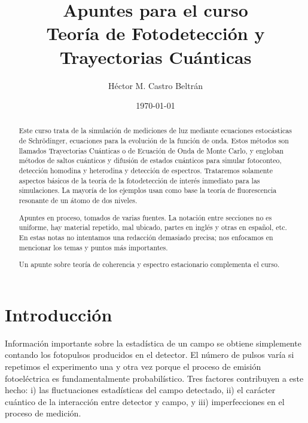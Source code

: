 \documentclass[twocolumn,aps,eqsecnum,showkeys,amsmath]{revtex4}
\begin{document}
\title{Apuntes para el curso  \\
Teor\'ia de Fotodetecci\'on y Trayectorias Cu\'anticas}
\author{H\'ector M. Castro Beltr\'an}

\date{\today}
\begin{abstract} 
Este curso trata de la simulaci\'on de mediciones de luz mediante 
ecuaciones estoc\'asticas de Schr\"odinger, ecuaciones para la evoluci\'on 
de la funci\'on de onda. Estos m\'etodos son llamados Trayectorias 
Cu\'anticas o de Ecuaci\'on de Onda de Monte Carlo, y engloban m\'etodos 
de saltos cu\'anticos y difusi\'on de estados cu\'anticos para simular 
fotoconteo, detecci\'on homodina y heterodina y  detecci\'on de espectros. 
Trataremos solamente aspectos b\'asicos de la teor\'ia de la fotodetecci\'on 
de inter\'es inmediato para las simulaciones. La mayor\'ia de los ejemplos 
usan como base la teor\'ia de fluorescencia resonante de un \'atomo de 
dos niveles. 

Apuntes en proceso, tomados de varias fuentes. La notaci\'on entre 
secciones no es uniforme, hay material repetido, mal ubicado, partes en 
ingl\'es y otras en espa\~nol, etc. En estas notas no intentamos una 
redacci\'on demasiado precisa; nos enfocamos en mencionar los temas 
y puntos m\'as importantes. 

Un apunte sobre teor\'ia de coherencia y espectro estacionario 
complementa el curso. 
\end{abstract}

\maketitle

\section{Introducci\'on}
Informaci\'on importante sobre la estad\'istica de un campo se obtiene 
simplemente contando los fotopulsos producidos en el detector. El 
n\'umero de pulsos var\'ia si repetimos el experimento una y otra vez 
porque el proceso de emisi\'on fotoel\'ectrica es fundamentalmente 
probabil\'istico. Tres factores contribuyen a este hecho: i) las 
fluctuaciones estad\'isticas del campo detectado, ii) el car\'acter 
cu\'antico de la interacci\'on entre detector y campo, y 
iii) imperfecciones en el proceso de medición. 
\end{document}
